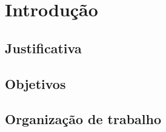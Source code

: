 \chapter{Introdução}
\label{intro}







\section{Justificativa}
\label{justificativa}


\section{Objetivos}
\label{objetivos}


\section{Organização de trabalho}

